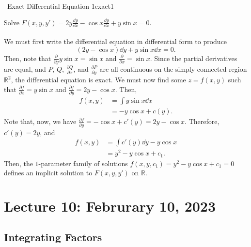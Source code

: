         \begin{example}{\Difficulty\,\Difficulty\,\,Exact Differential Equation 1}{exact1}

            Solve \(F(x,y,y')=2y\frac{\dd y}{\dd x}-\cos x\frac{\dd y}{\dd x}+y\sin x=0\).
            \\
            \\
            We must first write the differential equation in differential form to produce
            \begin{equation*}
                (2y-\cos x)\dd y+y\sin x\dd x=0.
            \end{equation*}
            Then, note that \(\frac{\partial}{\partial y}y\sin x=\sin x\) and \(\frac{\partial}{\partial x}=\sin x\). Since the partial derivatives are equal, and \(P\), \(Q\), \(\frac{\partial Q}{\partial x}\), and \(\frac{\partial P}{\partial y}\) are all continuous on the simply connected region \(\mathbb{R}^2\), the differential equation is exact. We must now find some \(z=f(x,y)\) such that \(\frac{\partial f}{\partial x}=y\sin x\) and \(\frac{\partial f}{\partial y}=2y-\cos x\). Then,
            \begin{align*}
                f(x,y)&=\int y\sin x\dd x \\
                &=-y\cos x+c(y).
            \end{align*}
            Note that, now, we have \(\frac{\partial f}{\partial y}=-\cos x+c'(y)=2y-\cos x\). Therefore, \(c'(y)=2y\), and
            \begin{align*}
                f(x,y)&=\int c'(y)\dd y-y\cos x \\
                &=y^2-y\cos x+c_1.
            \end{align*}
            Then, the \(1\)-parameter family of solutions \(f(x,y,c_1)=y^2-y\cos x+c_1=0\) defines an implicit solution to \(F(x,y,y')\) on \(\mathbb{R}\).
        \end{example}

\pagebreak

\section{Lecture 10: Februrary 10, 2023}

    \subsection{Integrating Factors}

